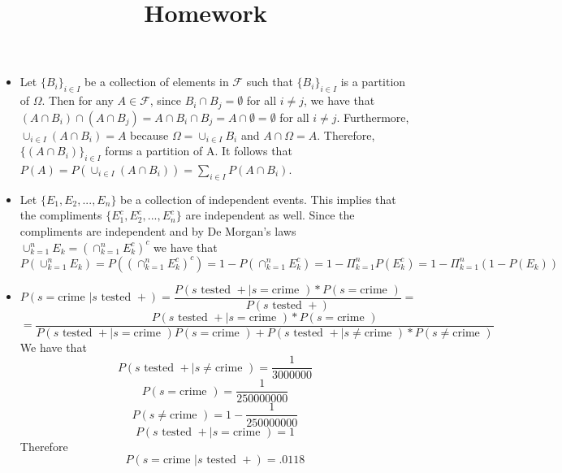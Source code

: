 \documentclass[12pt]{article}
\title{Homework}
\newenvironment{problem}[2][Problem]{\begin{trivlist}
\item[\hskip \labelsep {\bfseries #1}\hskip \labelsep {\bfseries #2}]}{\end{trivlist}}
\begin{document}
\begin{problem}{1.} \hfill
\begin{itemize}
\item[(3.6)] Let $\{ B_i\}_{i \in I}$ be a collection of elements in $\mathscr{F}$ such that $\{ B_i\}_{i \in I}$ is a partition of $\Omega$. Then for any $A \in \mathscr{F}$, since $B_i \cap B_j = \emptyset$ for all $i \neq j$, we have that $(A \cap B_i) \cap (A \cap B_j) = A \cap B_i \cap B_j = A \cap \emptyset=  \emptyset $ for all $i \neq j$. Furthermore, $\cup_{i \in I} (A \cap B_i) = A$ because $\Omega = \cup_{i \in I}  B_i$ and $A \cap \Omega = A$. Therefore, $\{(A \cap B_i)\}_{i \in I}$ forms a partition of A. It follows that $P(A) =P(\cup_{i \in I} (A \cap B_i)) =  \sum_{i \in I} P(A \cap B_i)$. 
 
\item[(3.8)] Let $\{E_1, E_2, ..., E_n\}$ be a collection of independent events. This implies that the compliments $\{E_1^c, E_2^c, ..., E_n^c\}$ are independent as well. Since the compliments are independent and by De Morgan's laws  $\cup_{k=1}^{n} E_k =  (\cap_{k=1}^{n} E_k^c)^c $ we have that 
$$P(\cup_{k=1}^{n} E_k) = P((\cap_{k=1}^{n} E_k^c)^c) = 1 - P(\cap_{k=1}^{n} E_k^c) = 1 - \Pi_{k=1}^{n} P(E_k^c) = 1 - \Pi_{k=1}^{n} (1 - P(E_k)) $$

\item[(3.11)] $$P(s = \text{crime } | s \text{ tested } +) = \frac{P(s \text{ tested } + | s = \text{crime }) * P(s = \text{crime })}{P(s \text{ tested } +)} =$$
$$ =  \frac{P(s \text{ tested } + | s = \text{crime }) * P(s = \text{crime })}{P(s \text{ tested } +|s = \text{crime })P(s = \text{crime })  +P(s \text{ tested } + | s \neq \text{crime }) * P(s \neq \text{crime }) } $$
We have that 
$$P(s \text{ tested } +| s \neq \text{crime }) = \frac{1}{3000000}$$
$$P(s = \text{crime }) = \frac{1}{250000000}$$
$$P(s \neq \text{crime }) = 1- \frac{1}{250000000}$$
$$P(s \text{ tested } + | s = \text{crime }) = 1$$
Therefore
$$P(s = \text{crime } | s \text{ tested } +) = .0118$$


\end{itemize}
\end{problem}
\end{document}
